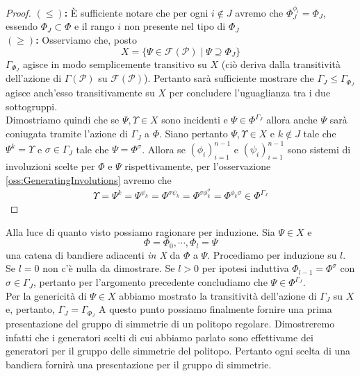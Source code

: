 \documentclass[a4paper,12pt]{report}
\newcommand{\p}{\mathcal{P}}
\theoremstyle{plain}
\theoremstyle{definition}
\newcommand\point[1]{$\bm{(#1)}$\textbf{: }}
\newcommand\flag[1]{\mathcal{F}(#1)}
\begin{document}
\begin{proof}
\point{\leq}\`E sufficiente notare che per ogni $i\notin J$ avremo che $\Phi_J^{\phi_i}=\Phi_J$, essendo $\Phi_J\subset\Phi$ e il rango $i$ non
presente nel tipo di $\Phi_J$\\
\point{\geq}Osserviamo che, posto
\begin{equation*}
X=\{\Psi\in\flag{\p}\mid \Psi\supseteq \Phi_J\}
\end{equation*}
$\Gamma_{\Phi_J}$ agisce in modo semplicemente transitivo su $X$ (ci\`o deriva dalla transitivit\`a dell'azione di $\Gamma(\p)$ su $\flag{\p}$).
Pertanto sar\`a sufficiente mostrare che $\Gamma_J\leq\Gamma_{\Phi_J}$ agisce anch'esso transitivamente su $X$ per concludere l'uguaglianza tra
i due sottogruppi.\\
Dimostriamo quindi che se $\Psi,\Upsilon\in X$ sono incidenti e $\Psi\in\Phi^{\Gamma_J}$ allora 
anche $\Psi$ sar\`a coniugata tramite l'azione di $\Gamma_J$ a $\Phi$. Siano pertanto
$\Psi,\Upsilon\in X$ e $k\notin J$ tale che $\Psi^k=\Upsilon$ e $\sigma\in\Gamma_J$ tale che $\Psi=\Phi^\sigma$.
Allora se $(\phi_i)_{i=1}^{n-1}$ e $(\psi_i)_{i=1}^{n-1}$ sono sistemi di involuzioni scelte
per $\Phi$ e $\Psi$ rispettivamente, per l'osservazione \ref{oss:GeneratingInvolutions} avremo che
\begin{gather*}
\Upsilon=\Psi^k=\Psi^{\psi_k}=\Phi^{\sigma\psi_k}=\Phi^{\sigma\phi_k^\sigma}=\Phi^{\phi_k\sigma}\in\Phi^{\Gamma_J}
\end{gather*}
\end{proof}
Alla luce di quanto visto possiamo ragionare per induzione. Sia $\Psi\in X$ e
\begin{equation*}
\Phi=\Phi_0,\cdots,\Phi_l=\Psi
\end{equation*}
una catena di bandiere adiacenti \emph{in X} da $\Phi$ a $\Psi$. Procediamo per induzione su $l$. Se $l=0$ non c'\`e nulla da dimostrare. 
Se $l>0$ per ipotesi induttiva $\Phi_{l-1}=\Phi^\sigma$ con $\sigma\in\Gamma_J$, pertanto per l'argomento precedente concludiamo che
$\Psi\in\Phi^{\Gamma_J}$.\\
Per la genericit\`a di $\Psi\in X$ abbiamo mostrato la transitivit\`a dell'azione di $\Gamma_J$ su $X$ e, pertanto, $\Gamma_J=\Gamma_{\Phi_J}$
A questo punto possiamo finalmente fornire una prima presentazione del gruppo di simmetrie di un politopo regolare. Dimostreremo infatti che i
generatori scelti di cui abbiamo parlato sono effettivame dei generatori per il gruppo delle simmetrie del politopo. Pertanto ogni scelta di una bandiera
fornir\`a una presentazione per il gruppo di simmetrie.\\
\end{document}
